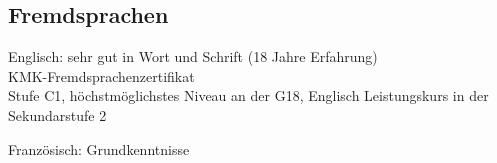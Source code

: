 \documentclass[10pt,letterpaper]{article}
\newenvironment{indentsection}[1]%
{\begin{list}{}%
	{\setlength{\leftmargin}{#1}}%
	\item[]%
}
{\end{list}}
\begin{document}
\subsection*{Fremdsprachen}

\begin{indentsection}{\parindent}
	\begin{description*}
		\item[Englisch:] sehr gut in Wort und Schrift (18 Jahre Erfahrung) \\ KMK-Fremdsprachenzertifikat \\ Stufe C1, höchstmöglichstes Niveau an der G18, 	Englisch Leistungskurs in der Sekundarstufe 2
		\item[Französisch:] Grundkenntnisse
	\end{description*}
\end{indentsection}
\end{document}
